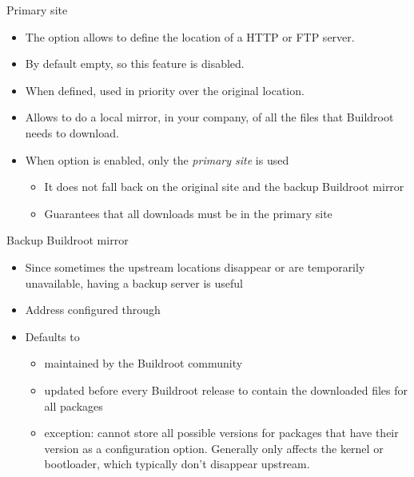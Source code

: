 \begin{frame}{Primary site}
  \begin{itemize}
  \item The  option allows to define the
    location of a HTTP or FTP server.
  \item By default empty, so this feature is disabled.
  \item When defined, used in priority over the original location.
  \item Allows to do a local mirror, in your company, of all the files
    that Buildroot needs to download.
  \item When option  is enabled, only the
    {\em primary site} is used
    \begin{itemize}
    \item It does not fall back on the original site and the backup
      Buildroot mirror
    \item Guarantees that all downloads must be in the primary site
    \end{itemize}
  \end{itemize}
\end{frame}

\begin{frame}{Backup Buildroot mirror}
  \begin{itemize}
  \item Since sometimes the upstream locations disappear or are
    temporarily unavailable, having a backup server is useful
  \item Address configured through 
  \item Defaults to 
    \begin{itemize}
    \item maintained by the Buildroot community
    \item updated before every Buildroot release to contain the
      downloaded files for all packages
    \item exception: cannot store all possible versions for packages
      that have their version as a configuration option. Generally
      only affects the kernel or bootloader, which typically don't
      disappear upstream.
    \end{itemize}
  \end{itemize}
\end{frame}

